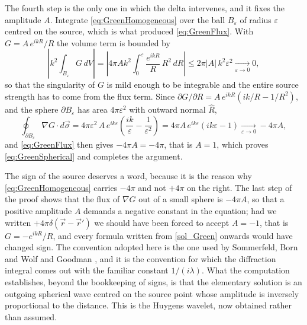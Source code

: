 		The fourth step is the only one in which the delta intervenes, and it fixes the amplitude $A$. Integrate \eqref{eq:GreenHomogeneous} over the ball $B_{\varepsilon}$ of radius $\varepsilon$ centred on the source, which is what produced \eqref{eq:GreenFlux}. With $G = A\,e^{ikR}/R$ the volume term is bounded by
		\begin{equation*}
			\left|k^{2}\int_{B_{\varepsilon}} G\, dV\right| = \left|4\pi A k^{2}\int_{0}^{\varepsilon} \frac{e^{ikR}}{R}\,R^{2}\,dR\right| \leq 2\pi |A|\,k^{2}\varepsilon^{2} \xrightarrow[\varepsilon\to 0]{} 0,
		\end{equation*}
		so that the singularity of $G$ is mild enough to be integrable and the entire source strength has to come from the flux term. Since $\partial G/\partial R = A\,e^{ikR}\left(ik/R - 1/R^{2}\right)$, and the sphere $\partial B_{\varepsilon}$ has area $4\pi\varepsilon^{2}$ with outward normal $\hat{R}$,
		\begin{equation*}
			\oint_{\partial B_{\varepsilon}} \nabla G\cdot d\vec{\sigma} = 4\pi\varepsilon^{2}\,A\,e^{ik\varepsilon}\left(\frac{ik}{\varepsilon}-\frac{1}{\varepsilon^{2}}\right) = 4\pi A\,e^{ik\varepsilon}\left(ik\varepsilon - 1\right) \xrightarrow[\varepsilon\to 0]{} -4\pi A ,
		\end{equation*}
		and \eqref{eq:GreenFlux} then gives $-4\pi A = -4\pi$, that is $A = 1$, which proves \eqref{eq:GreenSpherical} and completes the argument.

		The sign of the source deserves a word, because it is the reason why \eqref{eq:GreenHomogeneous} carries $-4\pi$ and not $+4\pi$ on the right. The last step of the proof shows that the flux of $\nabla G$ out of a small sphere is $-4\pi A$, so that a positive amplitude $A$ demands a negative constant in the equation; had we written $+4\pi\delta(\vec{r}-\vec{r}')$ we should have been forced to accept $A = -1$, that is $G = -e^{ikR}/R$, and every formula written from \eqref{sol_Green} onwards would have changed sign. The convention adopted here is the one used by Sommerfeld, Born and Wolf and Goodman \citep{sommerfeld1954optics, born1999principles, goodman2005introduction}, and it is the convention for which the diffraction integral comes out with the familiar constant $1/(i\lambda)$. What the computation establishes, beyond the bookkeeping of signs, is that the elementary solution is an outgoing spherical wave centred on the source point whose amplitude is inversely proportional to the distance. This is the Huygens wavelet, now obtained rather than assumed.

